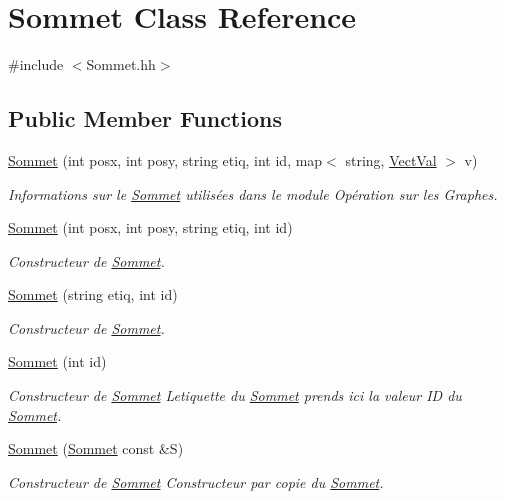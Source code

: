 \hypertarget{classSommet}{}\section{Sommet Class Reference}
\label{classSommet}


{\ttfamily \#include $<$Sommet.\+hh$>$}

\subsection*{Public Member Functions}
\begin{DoxyCompactItemize}
\item 
\hyperlink{classSommet_a1271a339feb213c3c920cf2398c886a0}{Sommet} (int posx, int posy, string etiq, int id, map$<$ string, \hyperlink{structVectVal}{Vect\+Val} $>$ v)
\begin{DoxyCompactList}\small\item\em Informations sur le \hyperlink{classSommet}{Sommet} utilis\'{e}es dans le module Op\'{e}ration sur les Graphes. \end{DoxyCompactList}\item 
\hyperlink{classSommet_aed2190e305ae93b9bcd58d4c6e126c79}{Sommet} (int posx, int posy, string etiq, int id)
\begin{DoxyCompactList}\small\item\em Constructeur de \hyperlink{classSommet}{Sommet}. \end{DoxyCompactList}\item 
\hyperlink{classSommet_a8a7df8f54224505a30a3bea671ae8e57}{Sommet} (string etiq, int id)
\begin{DoxyCompactList}\small\item\em Constructeur de \hyperlink{classSommet}{Sommet}. \end{DoxyCompactList}\item 
\hyperlink{classSommet_ad9c524cf3bbda843699ddd50fe424850}{Sommet} (int id)
\begin{DoxyCompactList}\small\item\em Constructeur de \hyperlink{classSommet}{Sommet} L\textquotesingle{}etiquette du \hyperlink{classSommet}{Sommet} prends ici la valeur ID du \hyperlink{classSommet}{Sommet}. \end{DoxyCompactList}\item 
\hyperlink{classSommet_ad8ff076abfbec4d8ab07ff3f665ad426}{Sommet} (\hyperlink{classSommet}{Sommet} const \&S)
\begin{DoxyCompactList}\small\item\em Constructeur de \hyperlink{classSommet}{Sommet} Constructeur par copie du \hyperlink{classSommet}{Sommet}. \end{DoxyCompactList}\item 

\end{DoxyCompactItemize}
